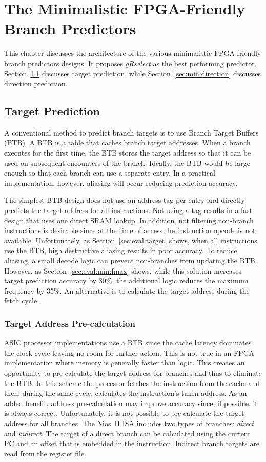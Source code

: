\chapter{The Minimalistic FPGA-Friendly Branch Predictors}
\label{chap:minimal}
This chapter discusses the architecture of the various minimalistic FPGA-friendly branch predictors designs. It proposes \textit{gRselect} as the best performing predictor. Section~\ref{sec:min:target} discusses target prediction, while Section~\ref{sec:min:direction} discusses direction prediction.

\section{Target Prediction}
\label{sec:min:target}
A conventional method to predict branch targets is to use Branch Target Buffers (BTB). A BTB is a table that caches branch target addresses. When a branch executes for the first time, the BTB stores the target address so that it can be used on subsequent encounters of the branch. Ideally, the BTB would be large enough so that each branch can use a separate entry. In a practical implementation, however, aliasing will occur reducing prediction accuracy.  

The simplest BTB design does not use an address tag per entry and directly predicts the target address for all instructions. Not using a tag results in a fast design that uses one direct SRAM lookup. In addition, not filtering non-branch instructions is desirable since at the time of access the instruction opcode is not available. Unfortunately, as Section~\ref{sec:eval:target} shows, when all instructions use the BTB, high destructive aliasing results in poor accuracy. To reduce aliasing, a small decode logic can prevent non-branches from updating the BTB. However, as Section~\ref{sec:eval:min:fmax} shows, while this solution increases target prediction accuracy by 30\%, the additional logic reduces the maximum frequency by 35\%. An alternative is to calculate the target address during the fetch cycle.


\subsection{Target Address Pre-calculation}
\label{sec:min:target:addrprecalc}
ASIC processor implementations use a BTB since the cache latency dominates the clock cycle leaving no room for further action. This is not true in an FPGA implementation where memory is generally faster than logic. This creates an opportunity to pre-calculate the target address for branches and thus to eliminate the BTB. In this scheme the processor fetches the instruction from the cache and then, during the same cycle, calculates the instruction's taken address. As an added benefit, address pre-calculation may improve accuracy since, if possible, it is always correct. Unfortunately, it is not possible to pre-calculate the target address for all branches. The Nios~II ISA includes two types of branches: \textit{direct} and \textit{indirect}. The target of a direct branch can be calculated using the current PC and an offset that is embedded in the instruction. Indirect branch targets are read from the register file.  

